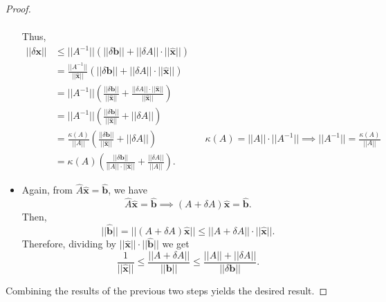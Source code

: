 \documentclass[letterpaper]{article}
\newcommand{\0}{\mathbf{0}}
\renewcommand{\b}{\mathbf{b}}
\newcommand{\x}{\mathbf{x}}
\begin{document}
\begin{proof}
\begin{itemize}
\begin{equation*}
\begin{aligned}
            \end{aligned}
        \end{equation*}
        Thus, 
        \begin{equation*}
            \begin{aligned}
                ||\delta\x|| &\leq ||A^{-1}|| (||\delta\b|| + ||\delta A|| \cdot ||\hat{\x}||) \\ 
                    &= \frac{||A^{-1}||}{||\hat{\x}||} (||\delta\b|| + ||\delta A|| \cdot ||\hat{\x}||) \\ 
                    &= ||A^{-1}|| \left(\frac{||\delta\b||}{||\hat{\x}||} + \frac{||\delta A|| \cdot ||\hat{\x}||}{||\hat{\x}||}\right) \\ 
                    &= ||A^{-1}|| \left(\frac{||\delta\b||}{||\hat{\x}||} + ||\delta A||\right) \\ 
                    &= \frac{\kappa(A)}{||A||} \left(\frac{||\delta\b||}{||\hat{\x}||} + ||\delta A||\right) && \kappa(A) = ||A|| \cdot ||A^{-1}|| \implies ||A^{-1}|| = \frac{\kappa(A)}{||A||} \\ 
                    &= \kappa(A) \left(\frac{||\delta\b||}{||A|| \cdot ||\hat{\x}||} + \frac{||\delta A||}{||A||}\right).
            \end{aligned}
        \end{equation*}

        \item Again, from $\hat{A}\hat{\x} = \hat{\b}$, we have 
        \[\hat{A}\hat{\x} = \hat{\b} \implies (A + \delta A) \hat{\x} = \hat{\b}.\]
        Then, 
        \[||\hat{\b}|| = ||(A + \delta A) \hat{\x}|| \leq ||A + \delta A|| \cdot ||\hat{\x}||.\]
        Therefore, dividing by $||\hat{\x}|| \cdot ||\hat{\b}||$ we get 
        \[\frac{1}{||\hat{\x}||} \leq \frac{||A + \delta A||}{||\b||} \leq \frac{||A|| + ||\delta A||}{||\delta \b||}.\]
    \end{itemize}
    Combining the results of the previous two steps yields the desired result.
\end{proof}
\end{document}
